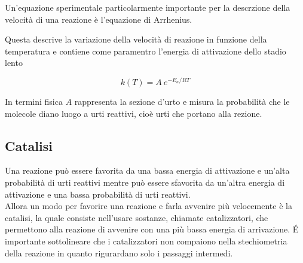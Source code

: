 Un'equazione sperimentale particolarmente importante per la descrzione della velocità di una reazione è l'equazione di Arrhenius. 

Questa descrive la variazione della velocità di reazione in funzione della temperatura e contiene come paramentro l'energia di attivazione dello stadio lento 

\begin{equation}
    k(T) = A \ e^{-E_a/RT}
    \label{equazione_Arrhenius}
\end{equation}

In termini fisica $A$ rappresenta la sezione d'urto e misura la probabilità che le molecole diano luogo a urti reattivi, cioè urti che portano alla rezione. \\

\subsection{Catalisi}

Una reazione può essere favorita da una bassa energia di attivazione e un'alta probabilità di urti reattivi mentre può essere sfavorita da un'altra energia di attivazione e una bassa probabilità di urti reattivi. \\

Allora un modo per favorire una reazione e farla avvenire più velocemente è la catalisi, la quale consiste nell'usare sostanze, chiamate catalizzatori, che permettono alla reazione di avvenire con una più bassa energia di arrivazione. \' E importante sottolineare che i catalizzatori non compaiono nella stechiometria della reazione in quanto rigurardano solo i passaggi intermedi. 

